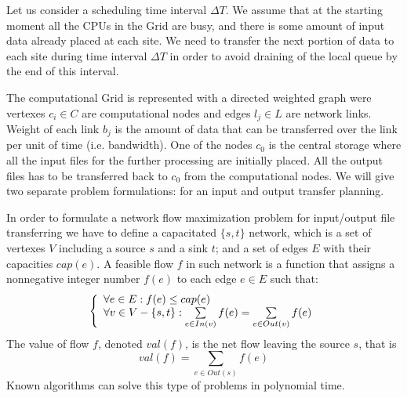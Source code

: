 Let us consider a scheduling time interval $\Delta T$. We assume that at the starting moment all the CPUs in the Grid are busy, and there is some amount of input data already placed at each site. We need to transfer the next portion of data to each site during time interval $\Delta T$ in order to avoid draining of the local queue by the end of this interval. 

The computational Grid is represented with a directed weighted graph were vertexes $c_{i} \in C$ are computational nodes and edges $l_{j} \in L$ are network links. Weight of each link $b_{j}$ is the amount of data that can be transferred over the link per unit of time (i.e. bandwidth). One of the nodes $c_{0}$ is the central storage where all the input files for the further processing are initially placed. All the output files has to be transferred back to $c_{0}$ from the computational nodes. We will give two separate problem formulations: for an input and output transfer planning. 

In order to formulate a network flow maximization problem for input/output file transferring we have to define a capacitated $\{s,t\}$ network, which is a set of vertexes $V$ including a source $s$ and a sink $t$; and a set of edges $E$ with their capacities $cap(e)$. A feasible flow $f$ in such network is a function that assigns a nonnegative integer number $f(e)$ to each edge $e \in E$ such that:
\begin{equation}
\label{netflowprob} 
 \left\{ \begin{array}{l l}
 \forall e \in E: f(e) \leq cap(e) \\
 \forall v \in V-\{s,t\}: \sum\limits_{e \in In(v)} f(e) = \sum\limits_{e \in Out(v)} f(e)
  \end{array} \right.
\end{equation}  
The value of flow $f$, denoted $val(f)$, is the net flow leaving the source $s$, that is
\begin{equation}
\label{flowval}
val(f) = \sum\limits_{e \in Out(s)} f(e)
\end{equation} 
Known algorithms can solve this type of problems in polynomial time. 

